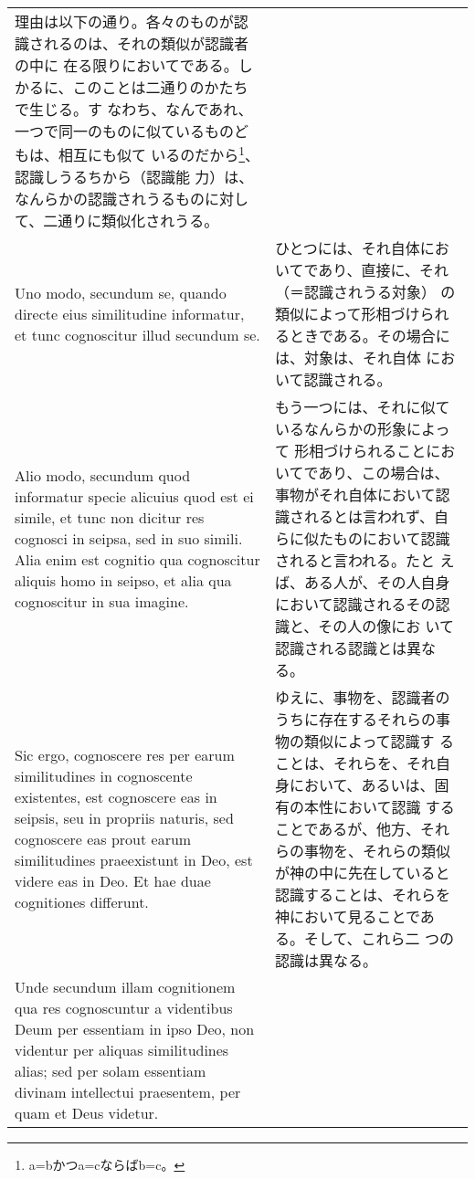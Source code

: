 \documentclass[10pt]{jsarticle} %
\begin{document}
\begin{longtable}{p{21em}p{21em}}
理由は以下の通り。各々のものが認識されるのは、それの類似が認識者の中に
在る限りにおいてである。しかるに、このことは二通りのかたちで生じる。す
なわち、なんであれ、一つで同一のものに似ているものどもは、相互にも似て
いるのだから\footnote{a=bかつa=cならばb=c。}、認識しうるちから（認識能
力）は、なんらかの認識されうるものに対して、二通りに類似化されうる。

\\

Uno modo, secundum se, quando directe eius similitudine informatur, et
tunc cognoscitur illud secundum se.

&

ひとつには、それ自体においてであり、直接に、それ（＝認識されうる対象）
の類似によって形相づけられるときである。その場合には、対象は、それ自体
において認識される。

\\

Alio
modo, secundum quod informatur specie alicuius quod est ei simile, et
tunc non dicitur res cognosci in seipsa, sed in suo simili. Alia enim
est cognitio qua cognoscitur aliquis homo in seipso, et alia qua
cognoscitur in sua imagine.

&

もう一つには、それに似ているなんらかの形象によって
形相づけられることにおいてであり、この場合は、事物がそれ自体において認
識されるとは言われず、自らに似たものにおいて認識されると言われる。たと
えば、ある人が、その人自身において認識されるその認識と、その人の像にお
いて認識される認識とは異なる。

\\

Sic ergo, cognoscere res per earum similitudines in cognoscente
existentes, est cognoscere eas in seipsis, seu in propriis naturis,
sed cognoscere eas prout earum similitudines praeexistunt in Deo, est
videre eas in Deo. Et hae duae cognitiones differunt. 

&

ゆえに、事物を、認識者のうちに存在するそれらの事物の類似によって認識す
ることは、それらを、それ自身において、あるいは、固有の本性において認識
することであるが、他方、それらの事物を、それらの類似が神の中に先在していると
認識することは、それらを神において見ることである。そして、これら二
つの認識は異なる。

\\

Unde secundum illam cognitionem qua res cognoscuntur a videntibus Deum
per essentiam in ipso Deo, non videntur per aliquas similitudines
alias; sed per solam essentiam divinam intellectui praesentem, per
quam et Deus videtur.


\end{longtable}
\end{document}
